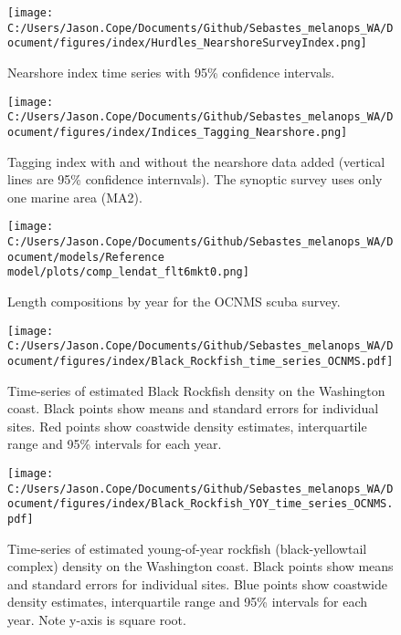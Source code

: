 \documentclass[11pt,
  english,
  letterpaper,
]{article}
\begin{document}
\pagebreak

\begin{figure}
\centering
\texttt{[image: C:/Users/Jason.Cope/Documents/Github/Sebastes\_melanops\_WA/Document/figures/index/Hurdles\_NearshoreSurveyIndex.png]}
\caption{Nearshore index time series with 95\% confidence intervals.\label{fig:nearshore-index}}
\end{figure}

\pagebreak

\begin{figure}
\centering
\texttt{[image: C:/Users/Jason.Cope/Documents/Github/Sebastes\_melanops\_WA/Document/figures/index/Indices\_Tagging\_Nearshore.png]}
\caption{Tagging index with and without the nearshore data added (vertical lines are 95\% confidence internvals). The synoptic survey uses only one marine area (MA2).\label{fig:tag-nearshore-index}}
\end{figure}

\pagebreak

\begin{figure}
\centering
\texttt{[image: C:/Users/Jason.Cope/Documents/Github/Sebastes\_melanops\_WA/Document/models/Reference model/plots/comp\_lendat\_flt6mkt0.png]}
\caption{Length compositions by year for the OCNMS scuba survey.\label{fig:ocnms-ltcomps}}
\end{figure}

\begin{figure}
\centering
\texttt{[image: C:/Users/Jason.Cope/Documents/Github/Sebastes\_melanops\_WA/Document/figures/index/Black\_Rockfish\_time\_series\_OCNMS.pdf]}
\caption{Time-series of estimated Black Rockfish density on the Washington coast. Black points show means and standard errors for individual sites. Red points show coastwide density estimates, interquartile range and 95\% intervals for each year.\label{fig:ocnms-adult-index}}
\end{figure}

\begin{figure}
\centering
\texttt{[image: C:/Users/Jason.Cope/Documents/Github/Sebastes\_melanops\_WA/Document/figures/index/Black\_Rockfish\_YOY\_time\_series\_OCNMS.pdf]}
\caption{Time-series of estimated young-of-year rockfish (black-yellowtail complex) density on the Washington coast. Black points show means and standard errors for individual sites. Blue points show coastwide density estimates, interquartile range and 95\% intervals for each year. Note y-axis is square root.\label{fig:ocnms-yoy-index}}
\end{figure}
\end{document}
